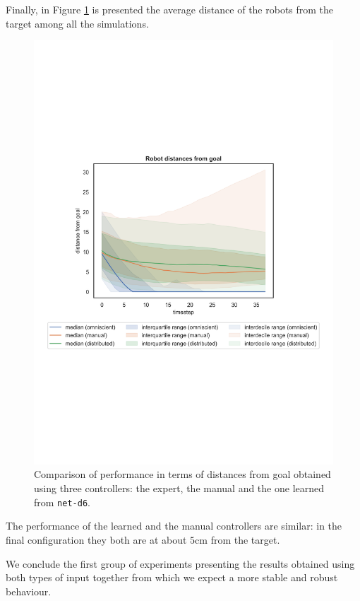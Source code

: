 Finally, in Figure \ref{fig:net-d6distance} is presented the average distance of the 
robots from the target among all the simulations. 
\begin{figure}[!htb]
	\centering
	\includegraphics[width=.65\textwidth]{contents/images/net-d6/distances-from-goal-compressed-distributed}%
		\caption[Evaluation of \texttt{net-d6} distances from goal.]{Comparison of 
		performance in terms of distances from goal obtained using three 
		controllers: the expert, the manual and the one learned from \texttt{net-d6}.}
	\label{fig:net-d6distance}
\end{figure}
The performance of the learned and the manual controllers are similar: in the 
final configuration they both are at about $5$\gls{cm} from the target. 

\bigskip
We conclude the first group of experiments presenting the results obtained 
using both types of input together from which we expect a more stable and 
robust behaviour. 

